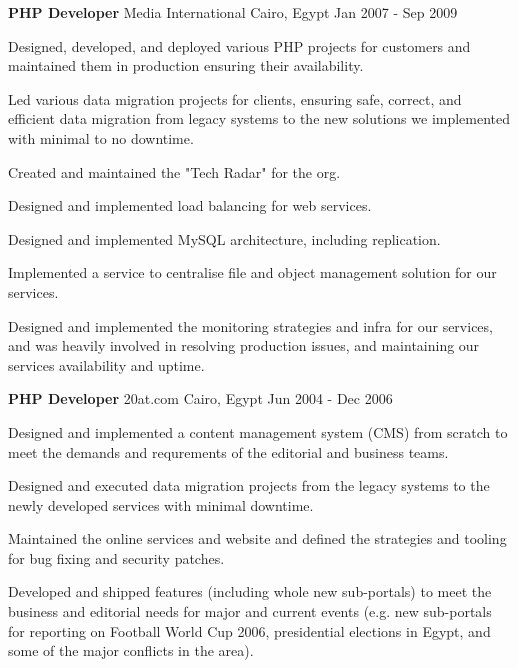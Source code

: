 \begin{cventries}
	\cventry
	{\textbf{PHP Developer}} %
	{Media International} %
	{Cairo, Egypt} %
	{Jan 2007 - Sep 2009} %
	{
		\begin{cvitems} %
			\item {
			            Designed, developed, and deployed various PHP projects for customers and
			            maintained them in production ensuring their availability.
			      }
			\item {
			            Led various data migration projects for clients, ensuring safe,
			            correct, and efficient data migration from legacy systems to the new
			            solutions we implemented with minimal to no downtime.
			      }
			\item {Created and maintained the "Tech Radar" for the org.}
			\item {
			            Designed and implemented load balancing for web services.
			      }
			\item {
			            Designed and implemented MySQL architecture, including replication.
			      }
			\item {
			            Implemented a service to centralise file and object management solution
			            for our services.
			      }
			\item {
			            Designed and implemented the monitoring strategies and infra for our
			            services, and was heavily involved in resolving production issues, and
			            maintaining our services availability and uptime.
			      }
		\end{cvitems}
	}

	\cventry
	{\textbf{PHP Developer}} %
	{20at.com} %
	{Cairo, Egypt} %
	{Jun 2004 - Dec 2006} %
	{
		\begin{cvitems} %
			\item {
			            Designed and implemented a content management system (CMS) from scratch
			            to meet the demands and requrements of the editorial and business
			            teams.
			      }
			\item {
			            Designed and executed data migration projects from the legacy systems
			            to the newly developed services with minimal downtime.
			      }
			\item {
			            Maintained the online services and website and defined the strategies
			            and tooling for bug fixing and security patches.
			      }
			\item {
			            Developed and shipped features (including whole new sub-portals) to
			            meet the business and editorial needs for major and current events
			            (e.g. new sub-portals for reporting on Football World Cup 2006,
			            presidential elections in Egypt, and some of the major conflicts in the
			            area).
			      }
		\end{cvitems}
	}
\end{cventries}
